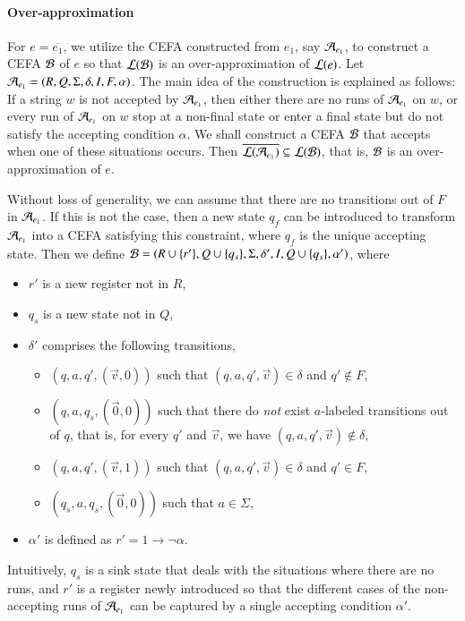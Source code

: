 \paragraph*{Over-approximation}
For $e = \overline{e_1}$, we utilize the CEFA constructed from $e_1$, say $\mathcal{A}_{e_1}$, to construct a CEFA $\mathcal{B}$ of $e$ so that $\mathcal{L}(\mathcal{B})$ is an over-approximation of $\mathcal{L}(e)$. 
Let $\mathcal{A}_{e_1} = (R, Q, \Sigma, \delta, I, F, \alpha)$. The main idea of the construction is explained as follows: If a string $w$ is not accepted by $\mathcal{A}_{e_1}$, then either there are no runs of $\mathcal{A}_{e_1}$ on $w$, or every run of $\mathcal{A}_{e_1}$ on $w$ stop at a non-final state or enter a final state but do not satisfy the accepting condition $\alpha$. We shall construct a CEFA $\mathcal{B}$ that accepts when one of these situations occurs. Then $\overline{\mathcal{L}(\mathcal{A}_{e_1})} \subseteq \mathcal{L}(\mathcal{B})$, that is, $\mathcal{B}$ is an over-approximation of $e$. 

Without loss of generality, we can assume that there are no transitions out of $F$ in $\mathcal{A}_{e_1}$. If this is not the case, then a new state $q_f$ can be introduced to transform $\mathcal{A}_{e_1}$ into a CEFA satisfying this constraint, where $q_f$ is the unique accepting state. 
Then we define $\mathcal{B}= (R \cup \{r'\}, Q \cup \{q_s\}, \Sigma, \delta', I, Q \cup \{q_s\}, \alpha')$, where
\begin{itemize}
  \item $r'$ is a new register not in $R$, 
  \item $q_s$ is a new state not in $Q$,
  \item $\delta'$ comprises the following transitions, 
  \begin{itemize}
    \item $(q, a, q', (\vec{v}, 0))$ such that $(q, a, q', \vec{v}) \in \delta$ and $q' \not \in F$,
%
    \item $(q, a, q_s,(\vec{0}, 0))$ such that there do \emph{not} exist $a$-labeled transitions out of $q$, that is, for every $q'$ and $\vec{v}$, we have $(q, a, q', \vec{v}) \not\in \delta$,
%
    \item $(q, a, q', (\vec{v}, 1))$ such that $(q, a, q', \vec{v}) \in \delta$ and $q' \in F$,
%
    \item $(q_s, a, q_s, (\vec{0}, 0))$ such that $a \in \Sigma$, 
  \end{itemize}
  \item $\alpha'$ is defined as $r' = 1 \rightarrow \neg \alpha$.
\end{itemize}
Intuitively, $q_s$ is a sink state that deals with the situations where there are no runs, and $r'$ is a register newly introduced so that the different cases of the non-accepting runs of $\mathcal{A}_{e_1}$ can be captured by a single accepting condition $\alpha'$. 

